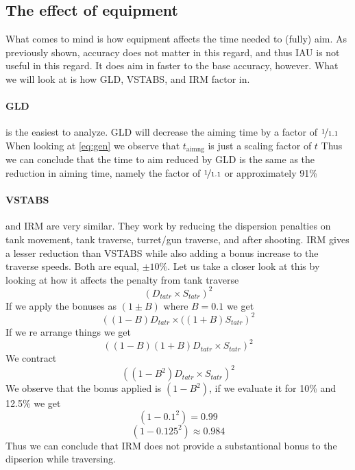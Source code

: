 \documentclass{article}
\begin{document}
\subsection{The effect of equipment}
What comes to mind is how equipment affects the time needed to (fully) aim. As previously shown,
accuracy does not matter in this regard, and thus IAU is not useful in this regard. It does aim in faster
to the base accuracy, however. What we will look at is how GLD, VSTABS, and IRM factor in.
\paragraph{GLD}
is the easiest to analyze. GLD will decrease the aiming time by a factor of \(\nicefrac{1}{1.1}\)
When looking at \eqref{eq:gen} we observe that \(t_{\mathrm{aimng}}\) is just a scaling factor of \(t\)
Thus we can conclude that the time to aim reduced by GLD is the same as the reduction in aiming time, namely
the factor of \(\nicefrac{1}{1.1}\) or approximately 91\%
\paragraph{VSTABS}
and IRM are very similar. They work by reducing the dispersion penalties on tank movement,
tank traverse, turret/gun traverse, and after shooting. IRM gives a lesser reduction than VSTABS while 
also adding a bonus increase to the traverse speeds. Both are equal, \(\pm 10\%\). Let us take a closer look at this by
looking at how it affects the penalty from tank traverse
\[\left(D_{tatr}\times S_{tatr}\right)^2\]
If we apply the bonuses as \(\left(1 \pm B\right)\) where \(B = 0.1\) we get
\[\left( \left(1 - B\right) D_{tatr}\times (\left(1 + B\right) S_{tatr}\right)^2\]
If we re arrange things we get
\[\left( \left(1 - B\right) \left(1 + B \right) D_{tatr}\times S_{tatr}\right)^2 \]
We contract
\[\left( \left(1 - B^2 \right) D_{tatr}\times S_{tatr} \right)^2\]
We observe that the bonus applied is \( \left(1 - B^2 \right)\), if we evaluate it for 10\% and 12.5\% we get
\[ \left(1 - 0.1^2 \right) = 0.99\]
\[ \left(1 - 0.125^2 \right) \approx 0.984\]
Thus we can conclude that IRM does not provide a substantional bonus to the dipserion while traversing.
\end{document}
